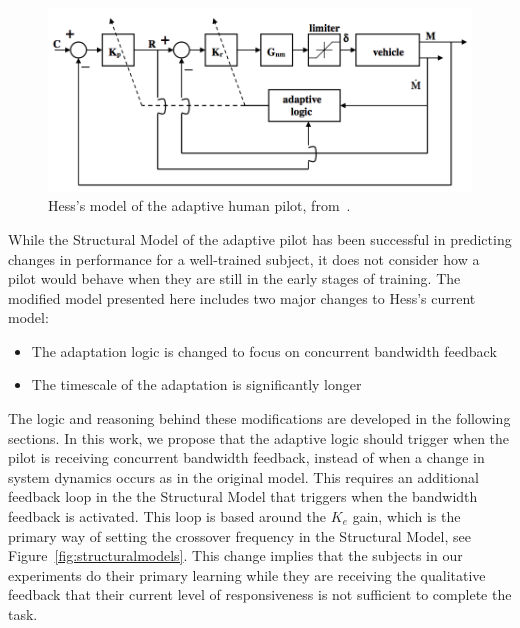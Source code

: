 \begin{figure}[tb]
    \begin{center}
        \includegraphics[width=0.8\linewidth]{figures/Modeling/Screen_Shot_2018-08-09_at_4_15_24_PM.png}
        \caption[Hess's model of the adaptive human pilot]{Hess's model of the adaptive human pilot, from~\citet{hess_modeling_2009}.}
        \label{figure:hesspursuit}
    \end{center}
\end{figure}

While the Structural Model of the adaptive pilot has been successful in predicting changes in performance for a well-trained subject, it does not consider how a pilot would behave when they are still in the early stages of training.
The modified model presented here includes two major changes to Hess's current model:
\begin{itemize}
    \item The adaptation logic is changed to focus on concurrent bandwidth feedback
    \item The timescale of the adaptation is significantly longer
\end{itemize}

The logic and reasoning behind these modifications are developed in the following sections.
In this work, we propose that the adaptive logic should trigger when the pilot is receiving concurrent bandwidth feedback, instead of when a change in system dynamics occurs as in the original model.
This requires an additional feedback loop in the the Structural Model that triggers when the bandwidth feedback is activated.
This loop is based around the $K_e$ gain, which is the primary way of setting the crossover frequency in the Structural Model, see Figure~\ref{fig:structuralmodels}.
This change implies that the subjects in our experiments do their primary learning while they are receiving the qualitative feedback that their current level of responsiveness is not sufficient to complete the task.

